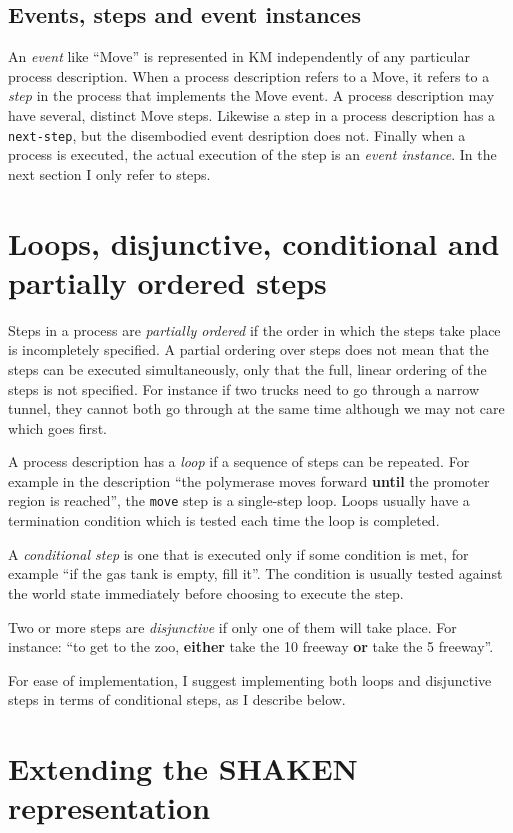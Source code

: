 \documentclass[fullpage]{article}
\begin{document}
\subsection*{Events, steps and event instances}

An {\em event} like ``Move'' is represented in KM independently of any
particular process description. When a process description refers to a
Move, it refers to a {\em step} in the process that implements the
Move event. A process description may have several, distinct Move
steps. Likewise a step in a process description has a {\tt next-step},
but the disembodied event desription does not. Finally when a process
is executed, the actual execution of the step is an {\em event
instance}. In the next section I only refer to steps.

\section*{Loops, disjunctive, conditional and partially ordered steps}

Steps in a process are {\em partially ordered} if the order in which
the steps take place is incompletely specified. A partial ordering
over steps does not mean that the steps can be executed
simultaneously, only that the full, linear ordering of the steps is
not specified. For instance if two trucks need to go through a narrow
tunnel, they cannot both go through at the same time although we may
not care which goes first.

A process description has a {\em loop} if a sequence of steps can be
repeated. For example in the description ``the polymerase moves forward
{\bf until} the promoter region is reached'', the {\tt move} step is a
single-step loop. Loops usually have a termination condition which is
tested each time the loop is completed.

A {\em conditional step} is one that is executed only if some condition
is met, for example ``if the gas tank is empty, fill it''. The condition
is usually tested against the world state immediately before choosing to
execute the step.

Two or more steps are {\em disjunctive} if only one of them will take
place. For instance: ``to get to the zoo, {\bf either} take the 10
freeway {\bf or} take the 5 freeway''.

For ease of implementation, I suggest implementing both loops and
disjunctive steps in terms of conditional steps, as I describe below.

\section*{Extending the SHAKEN representation}
\end{document}
